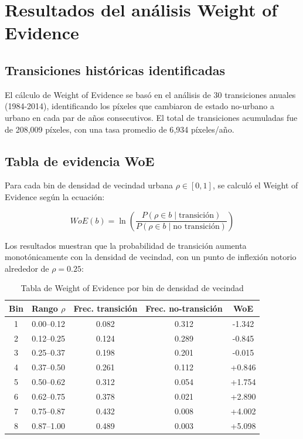 \section{Resultados del análisis Weight of Evidence}

\subsection{Transiciones históricas identificadas}

El cálculo de Weight of Evidence se basó en el análisis de 30 transiciones anuales (1984-2014), identificando los píxeles que cambiaron de estado no-urbano a urbano en cada par de años consecutivos. El total de transiciones acumuladas fue de 208{,}009 píxeles, con una tasa promedio de 6{,}934 píxeles/año.

\subsection{Tabla de evidencia WoE}

Para cada bin de densidad de vecindad urbana $\rho \in [0,1]$, se calculó el Weight of Evidence según la ecuación:

\begin{equation}
WoE(b) = \ln\left(\frac{P(\rho \in b \mid \text{transición})}{P(\rho \in b \mid \text{no transición})}\right)
\end{equation}

Los resultados muestran que la probabilidad de transición aumenta monotónicamente con la densidad de vecindad, con un punto de inflexión notorio alrededor de $\rho = 0.25$:

\begin{table}[htbp]
\centering
\caption{Tabla de Weight of Evidence por bin de densidad de vecindad}
\label{tab:woe_table}
\begin{tabular}{ccccc}
\toprule
\textbf{Bin} & \textbf{Rango $\rho$} & \textbf{Frec. transición} & \textbf{Frec. no-transición} & \textbf{WoE} \\
\midrule
1 & 0.00--0.12 & 0.082 & 0.312 & -1.342 \\
2 & 0.12--0.25 & 0.124 & 0.289 & -0.845 \\
3 & 0.25--0.37 & 0.198 & 0.201 & -0.015 \\
4 & 0.37--0.50 & 0.261 & 0.112 & +0.846 \\
5 & 0.50--0.62 & 0.312 & 0.054 & +1.754 \\
6 & 0.62--0.75 & 0.378 & 0.021 & +2.890 \\
7 & 0.75--0.87 & 0.432 & 0.008 & +4.002 \\
8 & 0.87--1.00 & 0.489 & 0.003 & +5.098 \\
\bottomrule
\end{tabular}
\end{table}

